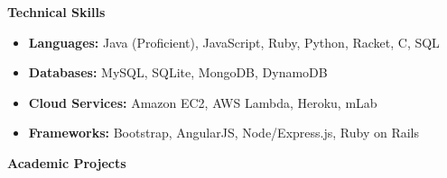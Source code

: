 \documentclass[letterpaper,11pt]{article}
\newcommand{\resheading}[1]{{\large \colorbox{mygrey}{\begin{minipage}{\textwidth}{\textbf{#1 \vphantom{p\^{E}}}}\end{minipage}}}}
\begin{document}

    \resheading{Technical Skills}

    \begin{itemize}
        \item {
        \textbf{Languages:}
        \vspace{-0.2cm}
        Java (Proficient), JavaScript, Ruby, Python, Racket, C, SQL
        }
        \item {
        \textbf{Databases:}
        \vspace{-0.2cm}
        MySQL, SQLite, MongoDB, DynamoDB
        }
        \item {
        \textbf{Cloud Services:}
        \vspace{-0.2cm}
        Amazon EC2, AWS Lambda, Heroku, mLab
        }
        \item {
        \textbf{Frameworks:}
        Bootstrap, AngularJS, Node/Express.js, Ruby on Rails
        }
    \end{itemize}


    \resheading{Academic Projects}
\end{document}
